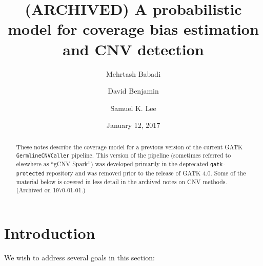 \documentclass[nofootinbib,amssymb,amsmath]{revtex4}
\begin{document}
\pagestyle{fancy}
\lhead{}
\rhead{}

\title{(ARCHIVED) A probabilistic model for coverage bias estimation and CNV detection}

\author{Mehrtash Babadi}

\author{David Benjamin}

\author{Samuel K. Lee}

\date{January 12, 2017}

\begin{abstract}
These notes describe the coverage model for a previous version of the current GATK \texttt{GermlineCNVCaller} pipeline.  This version of the pipeline (sometimes referred to elsewhere as ``gCNV Spark'') was developed primarily in the deprecated \texttt{gatk-protected} repository and was removed prior to the release of GATK 4.0.  Some of the material below is covered in less detail in the archived notes on CNV methods.  (Archived on \today.)
\end{abstract}

\maketitle

\section{Introduction}
\noindent We wish to address several goals in this section:
\end{document}
